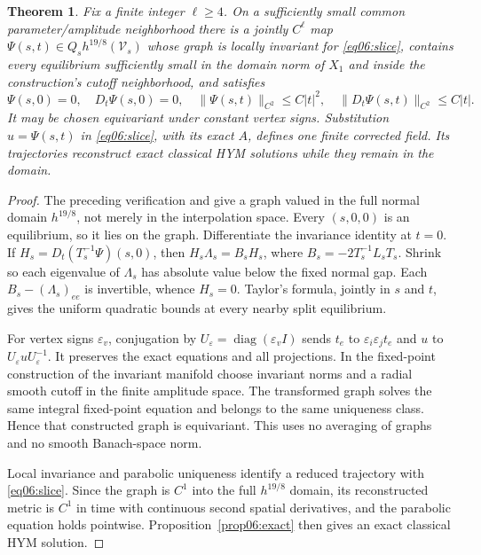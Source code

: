 \documentclass[11pt]{amsart}
\newtheorem{theorem}{Theorem}[section]
\theoremstyle{definition}
\theoremstyle{remark}
\newcommand{\diag}{\operatorname{diag}}
\begin{document}
\begin{theorem}\label{thm06:graph}
Fix a finite integer \(\ell\ge4\). On a sufficiently small common
parameter/amplitude neighborhood there is a jointly \(C^\ell\) map
\(\Psi(s,t)\in Q_sh^{19/8}(\mathcal V_s)\) whose graph is locally
invariant for \eqref{eq06:slice}, contains every equilibrium
sufficiently small in the domain norm of \(X_1\) and inside the
construction's cutoff neighborhood, and satisfies
\begin{equation}\label{eq06:graphbound}
 \Psi(s,0)=0,\quad D_t\Psi(s,0)=0,\quad
 \|\Psi(s,t)\|_{C^2}\le C|t|^2,\quad
 \|D_t\Psi(s,t)\|_{C^2}\le C|t|.
\end{equation}
It may be chosen equivariant under constant vertex signs. Substitution
\(u=\Psi(s,t)\) in \eqref{eq06:slice}, with its exact \(A\),
defines one finite corrected field. Its trajectories reconstruct
exact classical HYM solutions while they remain in the domain.
\end{theorem}

\begin{proof}
The preceding verification and \cite[Theorem~2.1]{simonett1994}
give a graph valued in the full normal domain \(h^{19/8}\), not
merely in the interpolation space. Every \((s,0,0)\) is an
equilibrium, so it lies on the graph. Differentiate the invariance
identity at \(t=0\). If \(H_s=D_t(T_s^{-1}\Psi)(s,0)\), then
\(H_s\Lambda_s=B_sH_s\), where
\(B_s=-2T_s^{-1}L_sT_s\). Shrink so each eigenvalue of
\(\Lambda_s\) has absolute value below the fixed normal gap.
Each \(B_s-(\Lambda_s)_{ee}\) is invertible, whence \(H_s=0\).
Taylor's formula, jointly in \(s\) and \(t\), gives the uniform
quadratic bounds at every nearby split equilibrium.

For vertex signs \(\varepsilon_v\), conjugation by
\(U_\varepsilon=\diag(\varepsilon_vI)\) sends
\(t_e\) to \(\varepsilon_i\varepsilon_jt_e\) and \(u\) to
\(U_\varepsilon uU_\varepsilon^{-1}\). It preserves the exact
equations and all projections. In the fixed-point construction of
the invariant manifold choose invariant norms and a radial smooth
cutoff in the finite amplitude space. The transformed graph solves
the same integral fixed-point equation and belongs to the same
uniqueness class. Hence that constructed graph is equivariant.
This uses no averaging of graphs and no smooth Banach-space norm.

Local invariance and parabolic uniqueness identify a reduced
trajectory with \eqref{eq06:slice}. Since the graph is \(C^1\)
into the full \(h^{19/8}\) domain, its reconstructed metric is
\(C^1\) in time with continuous second spatial derivatives, and
the parabolic equation holds pointwise. Proposition~\ref{prop06:exact}
then gives an exact classical HYM solution.
\end{proof}
\end{document}
